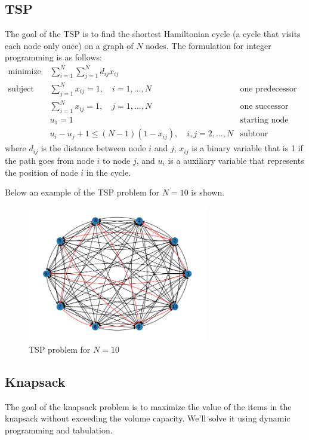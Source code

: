 \subsection{TSP}
The goal of the TSP is to find the shortest Hamiltonian cycle (a cycle that visits each node only once) on a graph of $N$ nodes. The formulation for integer programming is as follows:
\begin{align*}
    \text{minimize}   & \sum_{i=1}^{N}\sum_{j=1}^{N}d_{ij}x_{ij}                &                            \\
    \text{subject to} & \sum_{j=1}^{N}x_{ij} = 1, \quad i=1,\ldots,N            & \text{one predecessor}     \\
                      & \sum_{i=1}^{N}x_{ij} = 1, \quad j=1,\ldots,N            & \text{one successor}       \\
                      & u_1 = 1                                                 & \text{starting node}       \\
                      & u_i - u_j +1 \leq (N-1)(1-x_{ij}), \quad i,j=2,\ldots,N & \text{subtour elimination}
\end{align*}
where $d_{ij}$ is the distance between node $i$ and $j$, $x_{ij}$ is a binary variable that is 1 if the path goes from node $i$ to node $j$, and $u_i$ is a auxiliary variable that represents the position of node $i$ in the cycle.

Below an example of the TSP problem for $N=10$ is shown.
\begin{figure}[H]
    \centering
    \includegraphics[width=0.7\textwidth]{lab11/imgs/tsp.png}
    \caption{TSP problem for $N=10$}
    \label{fig:tsp}
\end{figure}

\subsection{Knapsack}
The goal of the knapsack problem is to maximize the value of the items in the knapsack without exceeding the volume capacity. We'll solve it using dynamic programming and tabulation.

